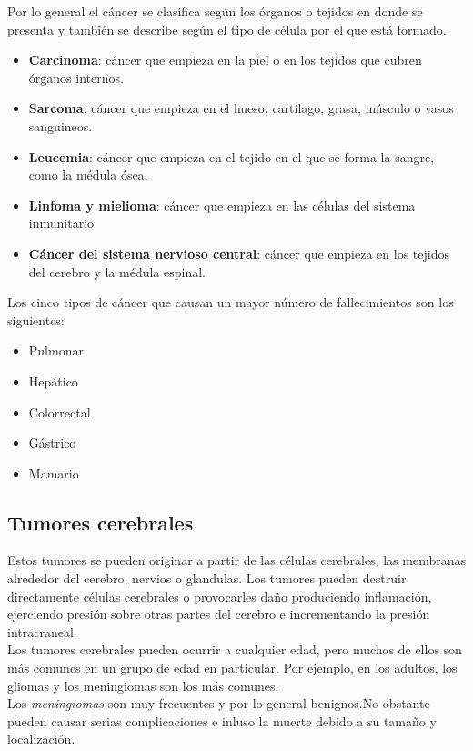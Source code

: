 Por lo general el cáncer se clasifica según los órganos o tejidos en donde se presenta y también se describe según el tipo de célula por el que está formado.

\begin{itemize}
	\item \textbf{Carcinoma}: cáncer que empieza en la piel o en los tejidos que cubren órganos internos.
	\item \textbf{Sarcoma}: cáncer que empieza en el hueso, cartílago, grasa, músculo o vasos sanguineos.
	\item \textbf{Leucemia}: cáncer que empieza en el tejido en el que se forma la sangre, como la médula ósea.
	\item \textbf{Linfoma y mielioma}: cáncer que empieza en las células del sistema inmunitario
	\item \textbf{Cáncer del sistema nervioso central}: cáncer que empieza en los tejidos del cerebro y la médula espinal.
\end{itemize}

Los cinco tipos de cáncer que causan un mayor número de fallecimientos son los siguientes:

\begin{itemize}
	\item Pulmonar
	\item Hepático
	\item Colorrectal
	\item Gástrico
	\item Mamario
\end{itemize}

\subsection{Tumores cerebrales}

Estos tumores se pueden originar a partir de las células cerebrales, las membranas alrededor del cerebro, nervios o glandulas. Los tumores pueden destruir directamente células cerebrales o provocarles daño produciendo inflamación, ejerciendo presión sobre otras partes del cerebro e incrementando la presión intracraneal.\\

Los tumores cerebrales pueden ocurrir a cualquier edad, pero muchos de ellos son más comunes en un grupo de edad en particular. Por ejemplo, en los adultos, los gliomas y los meningiomas son los más comunes.\\

Los \textit{meningiomas} son muy frecuentes y por lo general benignos.No obstante pueden causar serias complicaciones e inluso la muerte debido a su tamaño y localización.\\

